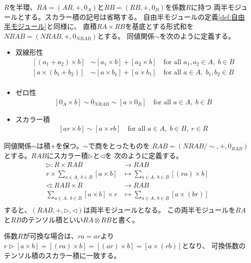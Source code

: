 	\begin{definition}[半モジュールのテンソル積]\label{def:半モジュールのテンソル積} %
		$R$を半環、$RA=(AR,+,0_A)$と$RB=(RB,+,0_B)$を係数$R$に持つ
		両半モジュールとする。スカラー積の記号は省略する。
		自由半モジュールの定義\ref{def:自由半モジュール}と同様に、
		直積$RA\times RB$を基底とする形式和を$NRAB=(NRAB,+,0_{NRAB})$とする。
		同値関係$\sim$を次のように定義する。
		\begin{itemize}
			\item 双線形性
			\begin{equation}\begin{split} %
				[(a_1+a_2)\times b] &\sim [a_1\times b] + [a_2\times b] \quad\text{for all }a_1,a_2\in A,\;b\in B \\
				[a\times (b_1+b_2)] &\sim [a\times b_1] + [a\times b_1] \quad\text{for all }a\in A,\;b_1,b_2\in B \\
			\end{split}\end{equation} %
			\item ゼロ性
			\begin{equation}\begin{split} %
				[0_A\times b] \sim 0_{NRAB} \sim [a\times 0_B] \quad\text{for all }a\in A,\;b\in B
			\end{split}\end{equation} %
			\item スカラー積
			\begin{equation}\begin{split} %
				[ar\times b] \sim [a\times rb] \quad\text{for all }a\in A,\;b\in B,\;r\in R
			\end{split}\end{equation} %
		\end{itemize}
		同値関係$\sim$は積$+$を保つ。$\sim$で商をとったものを
		$RAB=(NRAB/\sim,+,0_{RAB})$とする。$RAB$にスカラー積$\rhd$と$\lhd$を
		次のように定義する。
		\begin{equation}\begin{split} %
			\rhd: R\times RAB &\to RAB \\
				r\times \sum_{a\in A,\;b\in B}[a\times b]
					&\mapsto \sum_{a\in A,\;b\in B}[(ra)\times b] \\
			\lhd: RAB\times R &\to RAB \\
				\sum_{a\in A,\;b\in B}[a\times b]\times r
					&\mapsto \sum_{a\in A,\;b\in B}[a\times (br)] \\
		\end{split}\end{equation} %
		すると、$(RAB,+,\rhd,\lhd)$は両半モジュールとなる。
		この両半モジュールを$RA$と$RB$のテンソル積といい$RA\otimes RB$と書く。
	\end{definition} %

	係数$R$が可換な場合は、$ra=ar$より
	$r\rhd[a\times b]=[(ra)\times b]=[(ar)\times b]=[a\times (rb)]$となり、
	可換係数のテンソル積のスカラー積に一致する。
